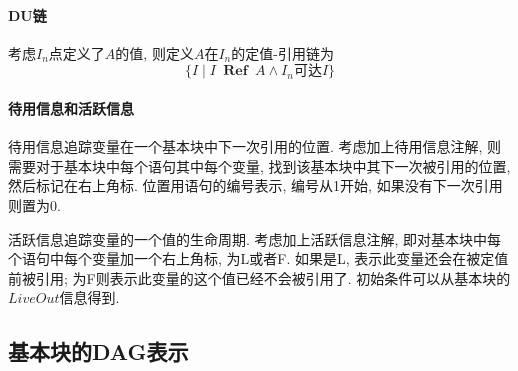 \documentclass{ctexart}
\DeclareMathOperator{\Ref}{\;\mathbf{Ref}\;}
\begin{document}
\paragraph{DU链} 考虑$I_n$点定义了$A$的值, 则定义$A$在$I_n$的定值-引用链为
    \[\{ I \;|\; I \Ref A \land I_n \text{可达} I\}\]\par
\paragraph{待用信息和活跃信息}
    待用信息追踪变量在一个基本块中下一次引用的位置. 考虑加上待用信息注解,
    则需要对于基本块中每个语句其中每个变量, 找到该基本块中其下一次被引用的位置,
    然后标记在右上角标. 位置用语句的编号表示, 编号从1开始, 如果没有下一次引用则置为0.\par
    
    活跃信息追踪变量的一个值的生命周期. 考虑加上活跃信息注解,
    即对基本块中每个语句中每个变量加一个右上角标, 为L或者F.
    如果是L, 表示此变量还会在被定值前被引用;
    为F则表示此变量的这个值已经不会被引用了.
    初始条件可以从基本块的$LiveOut$信息得到.

\subsection{基本块的DAG表示}
\end{document}
